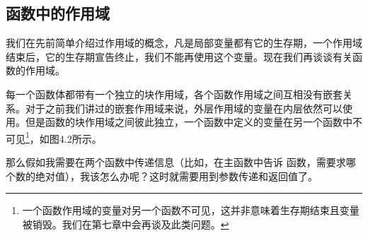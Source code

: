 \subsection*{函数中的作用域}
我们在先前简单介绍过作用域的概念，凡是局部变量都有它的生存期，一个作用域结束后，它的生存期宣告终止，我们不能再使用这个变量。现在我们再谈谈有关函数的作用域。\par
每一个函数体都带有一个独立的块作用域，各个函数作用域之间互相没有嵌套关系。对于之前我们讲过的嵌套作用域来说，外层作用域的变量在内层依然可以使用。但是函数的块作用域之间彼此独立，一个函数中定义的变量在另一个函数中不可见\footnote{一个函数作用域的变量对另一个函数不可见，这并非意味着生存期结束且变量被销毁。我们在第七章中会再谈及此类问题。}，如图4.2所示。\par
那么假如我需要在两个函数中传递信息（比如，在主函数中告诉 \lstinline@f@ 函数，需要求哪个数的绝对值），我该怎么办呢？这时就需要用到参数传递和返回值了。\par

